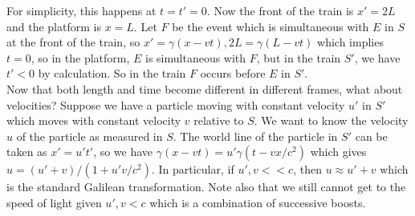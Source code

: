 For simplicity, this happens at $t=t'=0$.
Now the front of the train is $x'=2L$ and the platform is $x=L$.
Let $F$ be the event which is simultaneous with $E$ in $S$ at the front of the train, so $x'=\gamma(x-vt),2L=\gamma(L-vt)$ which implies $t=0$, so in the platform, $E$ is simultaneous with $F$, but in the train $S'$, we have $t'<0$ by calculation.
So in the train $F$ occurs before $E$ in $S'$.\\
Now that both length and time become different in different frames, what about velocities?
Suppose we have a particle moving with constant velocity $u'$ in $S'$ which moves with constant velocity $v$ relative to $S$.
We want to know the velocity $u$ of the particle as measured in $S$.
The world line of the particle in $S'$ can be taken as $x'=u't'$, so we have $\gamma(x-vt)=u'\gamma(t-vx/c^2)$ which gives $u=(u'+v)/(1+u'v/c^2)$.
In particular, if $u',v<<c$, then $u\approx u'+v$ which is the standard Galilean transformation.
Note also that we still cannot get to the speed of light given $u',v<c$ which is a combination of successive boosts.
